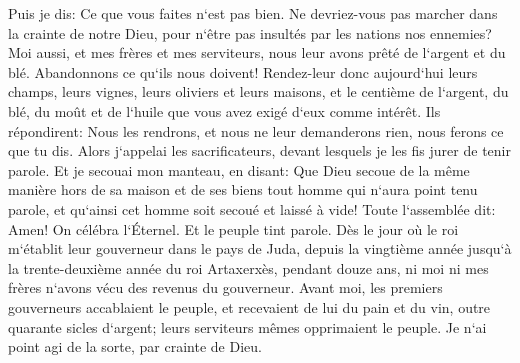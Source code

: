 \verse Puis je dis: Ce que vous faites n`est pas bien. Ne devriez-vous pas marcher dans la crainte de notre Dieu, pour n`être pas insultés par les nations nos ennemies? 
\verse Moi aussi, et mes frères et mes serviteurs, nous leur avons prêté de l`argent et du blé. Abandonnons ce qu`ils nous doivent! 
\verse Rendez-leur donc aujourd`hui leurs champs, leurs vignes, leurs oliviers et leurs maisons, et le centième de l`argent, du blé, du moût et de l`huile que vous avez exigé d`eux comme intérêt. 
\verse Ils répondirent: Nous les rendrons, et nous ne leur demanderons rien, nous ferons ce que tu dis. Alors j`appelai les sacrificateurs, devant lesquels je les fis jurer de tenir parole. 
\verse Et je secouai mon manteau, en disant: Que Dieu secoue de la même manière hors de sa maison et de ses biens tout homme qui n`aura point tenu parole, et qu`ainsi cet homme soit secoué et laissé à vide! Toute l`assemblée dit: Amen! On célébra l`Éternel. Et le peuple tint parole. 
\verse Dès le jour où le roi m`établit leur gouverneur dans le pays de Juda, depuis la vingtième année jusqu`à la trente-deuxième année du roi Artaxerxès, pendant douze ans, ni moi ni mes frères n`avons vécu des revenus du gouverneur. 
\verse Avant moi, les premiers gouverneurs accablaient le peuple, et recevaient de lui du pain et du vin, outre quarante sicles d`argent; leurs serviteurs mêmes opprimaient le peuple. Je n`ai point agi de la sorte, par crainte de Dieu. 
